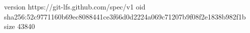 version https://git-lfs.github.com/spec/v1
oid sha256:52c9771160b69ec8088441ce3f66d0d2224a069c71207b9f08f2e1838b982f1b
size 43840
